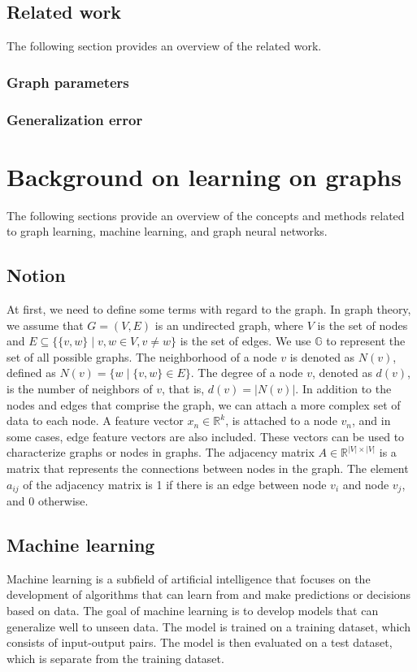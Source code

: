 \documentclass{article}
\begin{document}
\subsection{Related work}
The following section provides an overview of the related work.

\subsubsection{Graph parameters}


\subsubsection{Generalization error}





\section{Background on learning on graphs}
The following sections provide an overview of the concepts and methods related to graph learning, machine learning, and graph neural networks. 

\subsection{Notion}
At first, we need to define some terms with regard to the graph. In graph theory, we assume that $G=(V,E)$ is an undirected graph, where $V$ is the set of nodes and $E  \subseteq \{\{v,w\}\mid v,w \in V , v \neq w\}$ is the set of edges. We use $\mathbb{G}$ to represent the set of all possible graphs. The neighborhood of a node $v$ is denoted as $N(v)$, defined as $N(v) = \{w \mid \{v,w\} \in E\}$. The degree of a node $v$, denoted as $d(v)$, is the number of neighbors of $v$, that is, $d(v) = |N(v)|$. In addition to the nodes and edges that comprise the graph, we can attach a more complex set of data to each node.  A feature vector $x_n\in \mathbb{R}^k$, is attached to a node $v_n$, and in some cases, edge feature vectors are also included. These vectors can be used to characterize graphs or nodes in graphs. The adjacency matrix $A \in \mathbb{R}^{|V| \times |V|}$ is a matrix that represents the connections between nodes in the graph. The element $a_{ij}$ of the adjacency matrix is 1 if there is an edge between node $v_i$ and node $v_j$, and 0 otherwise.

\subsection{Machine learning}
Machine learning is a subfield of artificial intelligence that focuses on the development of algorithms that can learn from and make predictions or decisions based on data. The goal of machine learning is to develop models that can generalize well to unseen data. The model is trained on a training dataset, which consists of input-output pairs. The model is then evaluated on a test dataset, which is separate from the training dataset. 
\end{document}
